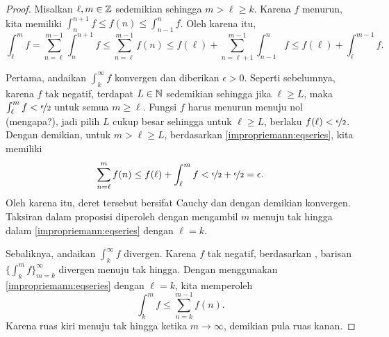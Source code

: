 \begin{proof}
Misalkan $\ell, m \in {\mathbb{Z}}$ sedemikian sehingga $m > \ell \geq k$.
Karena $f$ menurun, kita memiliki
$\int_{n}^{n+1} f \leq f(n) \leq \int_{n-1}^{n} f$.  Oleh karena itu,
\begin{equation} \label{impropriemann:eqseries}
\int_\ell^m f
=
\sum_{n=\ell}^{m-1} \int_{n}^{n+1} f
\leq
\sum_{n=\ell}^{m-1} f(n)
\leq
f(\ell) +
\sum_{n=\ell+1}^{m-1} \int_{n-1}^{n} f
\leq
f(\ell)+
\int_\ell^{m-1} f .
\end{equation}

Pertama, andaikan $\int_k^\infty f$ konvergen dan
diberikan $\epsilon > 0$.
Seperti sebelumnya, karena $f$ tak negatif, terdapat
$L \in {\mathbb{N}}$ sedemikian sehingga jika $\ell \geq L$, maka
$\int_\ell^{m} f < \nicefrac{\epsilon}{2}$ untuk semua $m \geq \ell$.
Fungsi
$f$ harus menurun menuju nol (mengapa?), jadi pilih $L$ cukup besar sehingga
untuk $\ell \geq L$, berlaku $f(\ell) < \nicefrac{\epsilon}{2}$.
Dengan demikian, untuk $m > \ell \geq L$, berdasarkan
\eqref{impropriemann:eqseries}, kita memiliki
\begin{equation*}
\sum_{n=\ell}^{m} f(n)
\leq
f(\ell)+
\int_\ell^{m} f < \nicefrac{\epsilon}{2} + \nicefrac{\epsilon}{2} = \epsilon .
\end{equation*}
Oleh karena itu, deret tersebut bersifat Cauchy dan dengan demikian konvergen.  Taksiran dalam
proposisi diperoleh dengan mengambil $m$ menuju tak hingga dalam
\eqref{impropriemann:eqseries} dengan $\ell = k$.

Sebaliknya, andaikan $\int_k^\infty f$ divergen.
Karena $f$ tak negatif, berdasarkan ,
barisan $\{ \int_k^m f \}_{m=k}^\infty$ divergen menuju tak hingga.
Dengan menggunakan
\eqref{impropriemann:eqseries} dengan $\ell = k$, kita memperoleh
\begin{equation*}
\int_k^m f
\leq
\sum_{n=k}^{m-1} f(n) .
\end{equation*}
Karena ruas kiri menuju tak hingga ketika $m \to \infty$, demikian pula
ruas kanan.
\end{proof}

